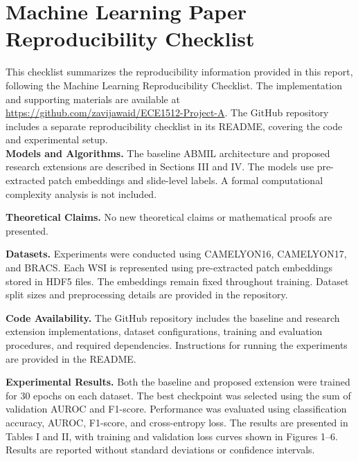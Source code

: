 \documentclass[journal]{IEEEtran}
\begin{document}
\ifCLASSOPTIONcaptionsoff
  \newpage
\fi

\appendices
\section{Machine Learning Paper Reproducibility Checklist}
\label{app:checklist}
This checklist summarizes the reproducibility information
provided in this report, following the Machine Learning
Reproducibility Checklist. The implementation and supporting
materials are available at
\href{https://github.com/zavijawaid/ECE1512-Project-A}
{https://github.com/zavijawaid/ECE1512-Project-A}.
The GitHub repository includes a separate reproducibility
checklist in its README, covering the code and experimental
setup.
\smallskip \\

\noindent\textbf{Models and Algorithms.}
The baseline ABMIL architecture and proposed research
extensions are described in Sections III and IV.
The models use pre-extracted patch embeddings and
slide-level labels. A formal computational complexity
analysis is not included.

\smallskip
\noindent\textbf{Theoretical Claims.}
No new theoretical claims or mathematical proofs
are presented.

\smallskip
\noindent\textbf{Datasets.}
Experiments were conducted using CAMELYON16,
CAMELYON17, and BRACS. Each WSI is represented
using pre-extracted patch embeddings stored in
HDF5 files. The embeddings remain fixed throughout
training. Dataset split sizes and preprocessing
details are provided in the repository.

\smallskip
\noindent\textbf{Code Availability.}
The GitHub repository includes the baseline and
research extension implementations, dataset
configurations, training and evaluation procedures,
and required dependencies. Instructions for running
the experiments are provided in the README.

\smallskip
\noindent\textbf{Experimental Results.}
Both the baseline and proposed extension were
trained for 30 epochs on each dataset. The best
checkpoint was selected using the sum of validation
AUROC and F1-score. Performance was evaluated
using classification accuracy, AUROC, F1-score,
and cross-entropy loss. The results are presented
in Tables I and II, with training and validation
loss curves shown in Figures 1--6.
Results are reported without standard deviations
or confidence intervals.
\end{document}
